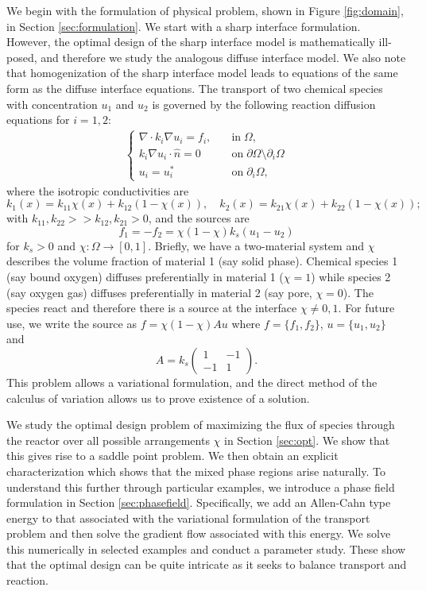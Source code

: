 \documentclass[11pt]{article}
\begin{document}
We begin with the formulation of physical problem, shown in Figure \ref{fig:domain}, in Section \ref{sec:formulation}.  We start with a sharp interface formulation.  However, the optimal design of the sharp interface model is mathematically ill-posed, and therefore we study the analogous diffuse interface model.  We also note that homogenization of the sharp interface model leads to equations of the same form as the diffuse interface equations.  The transport of two chemical species with concentration $u_1$ and $u_2$ is governed by the following reaction diffusion equations for $i=1,2$:
\begin{align} \label{eq:diffuse}
\begin{cases}
\nabla\cdot k_i \nabla u_i = f_i , \quad & \text{in}\;\Omega, \\
k_i \nabla u_i\cdot \hat{n}=0& \text{on}\;\partial\Omega\setminus\partial_{i}\Omega\\
u_i=u_i^*&\text{on}\;\partial_{i}\Omega,
\end{cases}
\end{align}
where the isotropic conductivities are 
\begin{equation} \label{eq:cond}
k_1(x)= k_{11} \chi(x)+ k_{12} (1- \chi(x)) , \quad
k_2(x)=k_{21}\chi(x) + k_{22} (1- \chi(x)) ;
\end{equation}
with $k_{11}, k_{22} >> k_{12},k_{21}  >0$, and the sources are
\begin{equation} \label{eq:source}
f_1 = - f_2 = \chi (1-\chi)  k_s (u_1 - u_2)
\end{equation}
for $k_s>0$ and $\chi: \Omega \to [0,1]$.  Briefly, we have a two-material system and $\chi$ describes the volume fraction of material 1 (say solid phase).  Chemical species 1 (say bound oxygen) diffuses preferentially in material 1 ($\chi =1$) while species 2 (say oxygen gas) diffuses preferentially in material 2 (say pore, $\chi =0$).  The species react and therefore there is a source at the interface $\chi \ne 0,1$.  For future use, we write the source as $f = \chi (1-\chi)  Au$ where $f = \{f_1, f_2\}$, $u=\{u_1,u_2\}$ and 
$$
A=k_s\left(\begin{array}{cc}
1 & -1\\
-1 & 1
\end{array}\right).
$$ 
This problem allows a variational formulation, and the direct method of the calculus of variation allows us to prove existence of a solution.

We study the optimal design problem of maximizing the flux of species through the reactor over all possible arrangements $\chi$ in Section \ref{sec:opt}.  We show that this gives rise to a saddle point problem.  We then obtain an explicit characterization which shows that the mixed phase regions arise naturally.  To understand this further through particular examples, we introduce a phase field formulation in Section \ref{sec:phasefield}.  Specifically, we add an Allen-Cahn type energy to that associated with the variational formulation of the transport problem and then solve the gradient flow associated with this energy.  We solve this numerically in selected examples and conduct a parameter study.  These show that the optimal design can be quite intricate as it seeks to balance transport and reaction.
\end{document}
